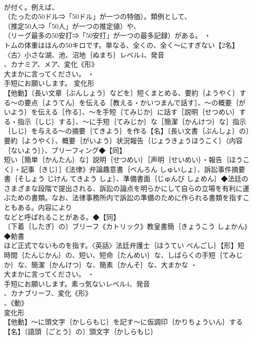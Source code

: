 \documentclass[8pt]{extreport}
\begin{document}
\begin{CJK}{UTF8}{min}
\\	が付く。例えば、
\\	（たったの50ドル⇒「50ドル」が一つの特価）。類例として、
\\	（推定50人⇒「50人」が一つの推定値）や、
\\	（リーグ最多の50安打⇒「50安打」が一つの最多記録）がある。 ・
\\	トムの体重はほんの50キロです。単なる、全くの、全く～にすぎない【2名】〈古〉小さな湖、池、沼地｛ぬまち｝レベル4、発音
\\	、カナミア、メア、変化《形》
\\	大まかに言ってください。 ・
\\	手短にお願いします。	変化形 
\\	【他動】〔長い文章｛ぶんしょう｝などを〕短くまとめる、要約｛ようやく｝する～の要点｛ようてん｝を伝える［教える・かいつまんで話す］、～の概要｛がいよう｝を伝える［作る］、～を手短｛てみじか｝に話す［説明｛せつめい｝する・指示｛しじ｝する］、～に手短｛てみじか｝な［簡潔｛かんけつ｝な］指示｛しじ｝を与える～の摘要｛てきよう｝を作る【名】〔長い文書｛ぶんしょ｝の〕要約｛ようやく｝、概要｛がいよう｝状況報告｛じょうきょうほうこく｝（内容｛ないよう｝）、ブリーフィング◆【同】
\\	短い［簡単｛かんたん｝な］説明｛せつめい｝［声明｛せいめい｝・報告｛ほうこく｝・記事｛きじ｝］《法律》弁論趣意書｛べんろん しゅいしょ｝、訴訟事件摘要書｛そしょう じけん てきよう しょ｝、準備書面｛じゅんび しょめん｝◆法廷のさまざまな段階で提出される、訴訟の論点を明らかにして自らの立場を有利に運ぶための書類。なお、法律事務所内で訴訟の準備のために作られる書類を指すこともある。内容により
\\	などと呼ばれることがある。◆【同】
\\	〔下着｛したぎ｝の〕ブリーフ《カトリック》教皇書簡｛きょうこう しょかん｝◆勅書
\\	ほど正式でないものを指す。〈英話〉法廷弁護士｛ほうてい べんごし｝【形】短時間｛たんじかん｝の、短い、短命｛たんめい｝な、しばらくの手短｛てみじか｝な、簡潔｛かんけつ｝な、簡素｛かんそ｝な、大まかな ・
\\	大まかに言ってください。 ・
\\	手短にお願いします。素っ気ないレベル4、発音
\\	、カナブリーフ、変化《形》
\\	、《動》
\\	変化形 
\\	【他動】～に頭文字｛かしらもじ｝を記す～に仮調印｛かりちょういん｝する【名】〔語頭｛ごとう｝の〕頭文字｛かしらもじ｝

\end{CJK}
\end{document}
